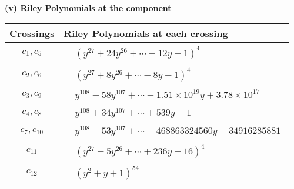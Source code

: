\documentclass[1p]{elsarticle_modified}
\theoremstyle{definition}
\begin{document}
\flushleft \textbf{(v) Riley Polynomials at the component}\newline \\
\begin{tabular}{m{50pt}|m{274pt}}
Crossings & \hspace{64pt}Riley Polynomials at each crossing \\
\hline $$\begin{aligned}c_{1},c_{5}\end{aligned}$$&$\begin{aligned}
&(y^{27}+24 y^{26}+\cdots-12 y-1)^{4}
\end{aligned}$\\
\hline $$\begin{aligned}c_{2},c_{6}\end{aligned}$$&$\begin{aligned}
&(y^{27}+8 y^{26}+\cdots-8 y-1)^{4}
\end{aligned}$\\
\hline $$\begin{aligned}c_{3},c_{9}\end{aligned}$$&$\begin{aligned}
&y^{108}-58 y^{107}+\cdots-1.51\times10^{19} y+3.78\times10^{17}
\end{aligned}$\\
\hline $$\begin{aligned}c_{4},c_{8}\end{aligned}$$&$\begin{aligned}
&y^{108}+34 y^{107}+\cdots+539 y+1
\end{aligned}$\\
\hline $$\begin{aligned}c_{7},c_{10}\end{aligned}$$&$\begin{aligned}
&y^{108}-53 y^{107}+\cdots-468863324560 y+34916285881
\end{aligned}$\\
\hline $$\begin{aligned}c_{11}\end{aligned}$$&$\begin{aligned}
&(y^{27}-5 y^{26}+\cdots+236 y-16)^{4}
\end{aligned}$\\
\hline $$\begin{aligned}c_{12}\end{aligned}$$&$\begin{aligned}
&(y^2+y+1)^{54}
\end{aligned}$\\
\hline
\end{tabular}\\~\\
\end{document}
